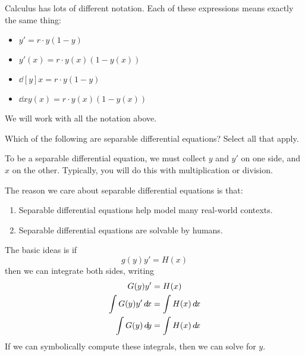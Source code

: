 \documentclass{ximera}
\begin{document}
\begin{warning}
  Calculus has lots of different notation. Each of these expressions
  means exactly the same thing:
  \begin{itemize}
  \item $y' = r\cdot y(1-y)$
  \item $y'(x) = r\cdot y(x)(1-y(x))$
  \item $\dd[y]{x} = r \cdot y(1-y)$
  \item $\dd{x} y(x) = r\cdot y(x) (1-y(x))$
  \end{itemize}
  We will work with all the notation above.
\end{warning}

\begin{question}
  Which of the following are separable differential equations?  Select all that apply.
  \begin{selectAll}
  \end{selectAll}
  \begin{hint}
    To be a separable differential equation, we must collect $y$ and
    $y'$ on one side, and $x$ on the other. Typically, you will do
    this with multiplication or division.
  \end{hint}
\end{question}

The reason we care about separable differential equations is that:
\begin{enumerate}
\item Separable differential equations help model many real-world contexts.
\item Separable differential equations are solvable by humans.
\end{enumerate}
The basic ideas is if
\[
g(y)y' = H(x)
\]
then we can integrate both sides, writing
\begin{align*}
  G(y)y'  &= H(x)\\
  \int G(y) y' \d x &= \int H(x) \d x\\
  \int G(y) \d y &= \int H(x) \d x
\end{align*}
If we can symbolically compute these integrals, then we can solve for
$y$.
\end{document}
